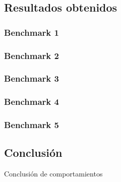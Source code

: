 \subsection{Resultados obtenidos}
\label{results}

\subsubsection{Benchmark 1}

\subsubsection{Benchmark 2}

\subsubsection{Benchmark 3}

\subsubsection{Benchmark 4}

\subsubsection{Benchmark 5}

\subsection{Conclusi\'on}
Conclusi\'on de comportamientos

